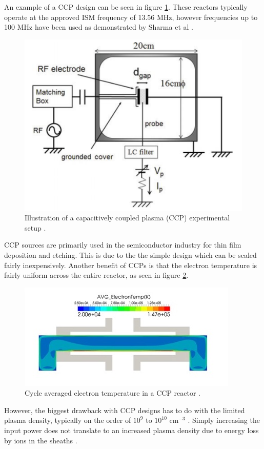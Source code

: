  An example of a CCP design can be seen in figure \ref{fig:CCP_reactor}. These reactors typically operate at the approved ISM frequency of 13.56 MHz, however frequencies up to 100 MHz have been used as demonstrated by Sharma et al \cite{Sharma2020}.

\begin{figure}[h!]
	\centering
	\includegraphics[width=0.6\linewidth]{chapter_2/figures/CCP_reactor.png}
	\caption{Illustration of a capacitively coupled plasma (CCP) experimental setup \cite{Ohtsu2018}.}
	\label{fig:CCP_reactor}
\end{figure} 

CCP sources are primarily used in the semiconductor industry for thin film deposition and etching. This is due to the the simple design which can be scaled fairly inexpensively. Another benefit of CCPs is that the electron temperature is fairly uniform across the entire reactor, as seen in figure \ref{fig:ccp_electron_temp}.

\begin{figure}[h!]
	\centering
	\includegraphics[width=0.6\linewidth]{chapter_2/figures/ccp_electron_temp.jpg}
	\caption{Cycle averaged electron temperature in a CCP reactor \cite{esgee_tech_2017}.}
	\label{fig:ccp_electron_temp}
\end{figure} 

However, the biggest drawback with CCP designs has to do with the limited plasma density, typically on the order of $10^{9}$ to $10^{10}$ cm$^{-3}$ \cite{Denpoh2021}. Simply increasing the input power does not translate to an increased plasma density due to energy loss by ions in the sheaths \cite{Iza2008}.

